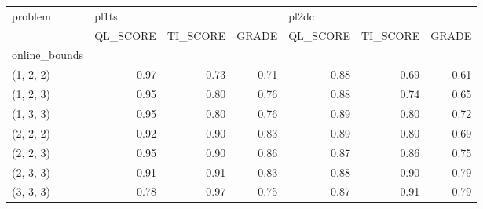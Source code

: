\begin{tabular}{lrrrrrr}
\toprule
problem & \multicolumn{3}{l}{pl1ts} & \multicolumn{3}{l}{pl2dc} \\
{} & QL\_SCORE & TI\_SCORE & GRADE & QL\_SCORE & TI\_SCORE & GRADE \\
online\_bounds &          &          &       &          &          &       \\
\midrule
(1, 2, 2)     &     0.97 &     0.73 &  0.71 &     0.88 &     0.69 &  0.61 \\
(1, 2, 3)     &     0.95 &     0.80 &  0.76 &     0.88 &     0.74 &  0.65 \\
(1, 3, 3)     &     0.95 &     0.80 &  0.76 &     0.89 &     0.80 &  0.72 \\
(2, 2, 2)     &     0.92 &     0.90 &  0.83 &     0.89 &     0.80 &  0.69 \\
(2, 2, 3)     &     0.95 &     0.90 &  0.86 &     0.87 &     0.86 &  0.75 \\
(2, 3, 3)     &     0.91 &     0.91 &  0.83 &     0.88 &     0.90 &  0.79 \\
(3, 3, 3)     &     0.78 &     0.97 &  0.75 &     0.87 &     0.91 &  0.79 \\
\bottomrule
\end{tabular}
